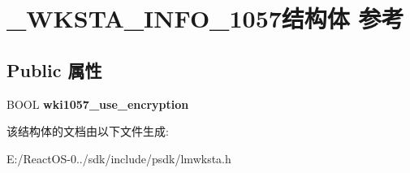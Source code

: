 \hypertarget{struct___w_k_s_t_a___i_n_f_o__1057}{}\section{\+\_\+\+W\+K\+S\+T\+A\+\_\+\+I\+N\+F\+O\+\_\+1057结构体 参考}
\label{struct___w_k_s_t_a___i_n_f_o__1057}
\subsection*{Public 属性}
\begin{DoxyCompactItemize}
\item 
\mbox{\label{struct___w_k_s_t_a___i_n_f_o__1057_a4d32b7fbe1e2b7fac158506f58b89b05}} 
B\+O\+OL {\bfseries wki1057\+\_\+use\+\_\+encryption}
\end{DoxyCompactItemize}


该结构体的文档由以下文件生成\+:\begin{DoxyCompactItemize}
\item 
E\+:/\+React\+O\+S-\/0../sdk/include/psdk/lmwksta.\+h\end{DoxyCompactItemize}
